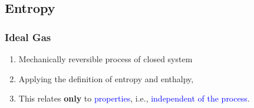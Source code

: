 \documentclass[10pt,compress,handout,ignorenonframetext]{beamer}
\begin{document}

\subsection{Entropy} 

\begin{frame}
 \frametitle{Ideal Gas}
   \begin{enumerate}
     \item<1-> Mechanically reversible process of closed system
     \item<2-> Applying the definition of entropy and enthalpy,
     \item<2-> This relates {\bf only} to \textcolor{blue}{properties}, i.e., \textcolor{blue}{independent of the process}.
   \end{enumerate}
 \normalsize
\end{frame}
\end{document}
